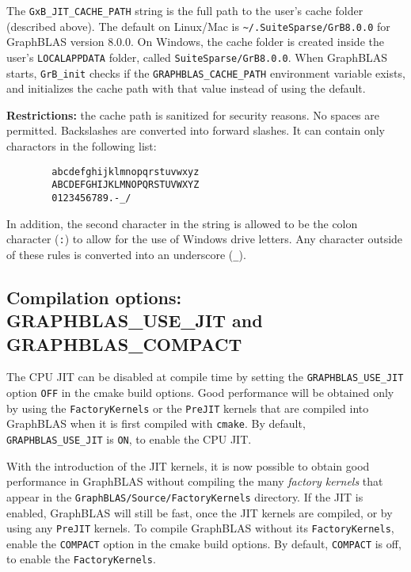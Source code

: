\documentclass[12pt]{article}
\begin{document}
The \verb'GxB_JIT_CACHE_PATH' string is the full path to the user's cache
folder (described above).  The default on Linux/Mac is
\verb'~/.SuiteSparse/GrB8.0.0' for GraphBLAS version 8.0.0.  On Windows,
the cache folder is created inside the user's \verb'LOCALAPPDATA' folder,
called \verb'SuiteSparse/GrB8.0.0'.  When GraphBLAS starts,
\verb'GrB_init' checks if the \verb'GRAPHBLAS_CACHE_PATH' environment variable
exists, and initializes the cache path with that value instead of using the
default.

{\bf Restrictions:} the cache path is sanitized for security reasons.  No spaces
are permitted.  Backslashes are converted into forward slashes.  It can contain
only charactors in the following list:

\begin{verbatim}
        abcdefghijklmnopqrstuvwxyz
        ABCDEFGHIJKLMNOPQRSTUVWXYZ
        0123456789.-_/
\end{verbatim}

In addition, the second character in the string is allowed to be the colon
character (\verb':') to allow for the use of Windows drive letters.  Any
character outside of these rules is converted into an underscore (\verb'_').

\subsection{Compilation options: {\sf GRAPHBLAS\_USE\_JIT} and {\sf GRAPHBLAS\_COMPACT}}

The CPU JIT can be disabled at compile time by setting the
\verb'GRAPHBLAS_USE_JIT' option \verb'OFF' in the cmake build options.  Good
performance will be obtained only by using the \verb'FactoryKernels' or the
\verb'PreJIT' kernels that are compiled into GraphBLAS when it is first
compiled with \verb'cmake'.  By default, \verb'GRAPHBLAS_USE_JIT' is \verb'ON',
to enable the CPU JIT.

With the introduction of the JIT kernels, it is now possible to obtain good
performance in GraphBLAS without compiling the many {\em factory kernels} that
appear in the \verb'GraphBLAS/Source/FactoryKernels' directory.  If the JIT is
enabled, GraphBLAS will still be fast, once the JIT kernels are compiled, or by
using any \verb'PreJIT' kernels.  To compile GraphBLAS without its
\verb'FactoryKernels', enable the \verb'COMPACT' option in the cmake build
options.  By default, \verb'COMPACT' is off, to enable the
\verb'FactoryKernels'.
\end{document}

